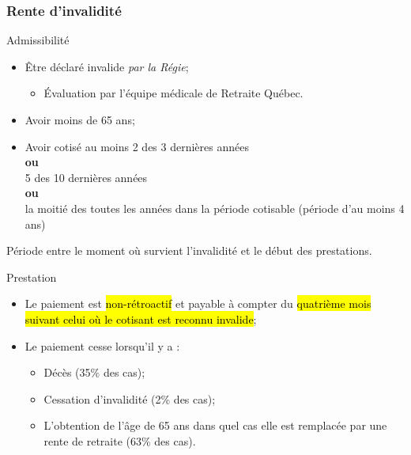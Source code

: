\documentclass[10pt, french]{article}
\begin{document}
\begin{multicols*}{3}
\subsubsection*{Rente d'invalidité}

\begin{conceptgen}{Admissibilité}
\begin{itemize}[leftmargin = *]
	\item	Être déclaré invalide \textit{par la Régie};
		\begin{itemize}[leftmargin = *]
		\item	Évaluation par l'équipe médicale de Retraite Québec.
		\end{itemize}
	\item	Avoir moins de 65 ans;
	\item	Avoir cotisé au moins 2 des 3 dernières années\\
			\textbf{ou}	\\
			5 des 10 dernières années	\\
			\textbf{ou}	\\
			la moitié des toutes les années dans la période cotisable (période d'au moins 4 ans)
\end{itemize}
\end{conceptgen}

\begin{definitionNOHFILL}
Période entre le moment où survient l'invalidité et le début des prestations.
\end{definitionNOHFILL}


\begin{conceptgen}{Prestation}
\begin{itemize}[leftmargin = *]
	\item	Le paiement est \hl{non-rétroactif} et payable à compter du \hl{quatrième mois suivant celui où le cotisant est reconnu invalide};
	\item	Le paiement cesse lorsqu'il y a :
		\begin{itemize}[leftmargin = *]
		\item	Décès (35\% des cas);
		\item	Cessation d'invalidité (2\% des cas);
		\item	L'obtention de l'âge de 65 ans dans quel cas elle est remplacée par une rente de retraite (63\% des cas).
		\end{itemize}
\end{itemize}
\end{conceptgen}


\end{multicols*}
\end{document}
